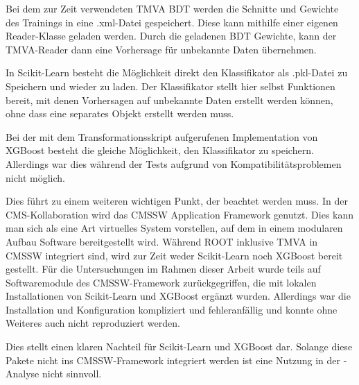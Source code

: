 Bei dem zur Zeit verwendeten TMVA BDT werden die Schnitte und Gewichte des Trainings in eine .xml-Datei gespeichert. Diese kann mithilfe einer eigenen Reader-Klasse geladen werden. Durch die geladenen BDT Gewichte, kann der TMVA-Reader dann eine Vorhersage f\"ur unbekannte Daten \"ubernehmen.

In Scikit-Learn besteht die M\"oglichkeit direkt den Klassifikator als .pkl-Datei zu Speichern und wieder zu laden. Der Klassifikator stellt hier selbst Funktionen bereit, mit denen Vorhersagen auf unbekannte Daten erstellt werden k\"onnen, ohne dass eine separates Objekt erstellt werden muss.

Bei der mit dem Transformationsskript aufgerufenen Implementation von XGBoost besteht die gleiche M\"oglichkeit, den Klassifikator zu speichern. Allerdings war dies w\"ahrend der Tests aufgrund von Kompatibilit\"atsproblemen nicht m\"oglich.

Dies f\"uhrt zu einem weiteren wichtigen Punkt, der beachtet werden muss. In der CMS-Kollaboration wird das CMSSW Application Framework genutzt. Dies kann man sich als eine Art virtuelles System vorstellen, auf dem in einem modularen Aufbau Software bereitgestellt wird. W\"ahrend ROOT inklusive TMVA in CMSSW integriert sind, wird zur Zeit weder Scikit-Learn noch XGBoost bereit gestellt. F\"ur die Untersuchungen im Rahmen dieser Arbeit wurde teils auf Softwaremodule des CMSSW-Framework zur\"uckgegriffen, die mit lokalen Installationen von Scikit-Learn und XGBoost erg\"anzt wurden. Allerdings war die Installation und Konfiguration kompliziert und fehleranf\"allig und konnte ohne Weiteres auch nicht reproduziert werden.

Dies stellt einen klaren Nachteil f\"ur Scikit-Learn und XGBoost dar. Solange diese Pakete nicht ins CMSSW-Framework integriert werden ist eine Nutzung in der \ttH-Analyse nicht sinnvoll.